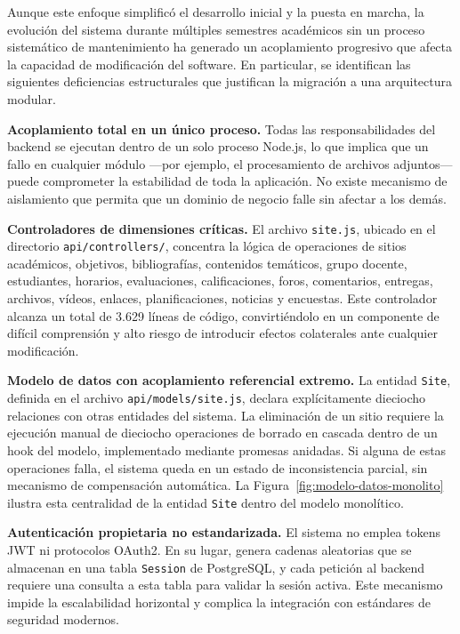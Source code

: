 Aunque este enfoque simplificó el desarrollo inicial y la puesta en marcha, la
evolución del sistema durante múltiples semestres académicos sin un proceso
sistemático de mantenimiento ha generado un acoplamiento progresivo que afecta la
capacidad de modificación del software. En particular, se identifican las siguientes
deficiencias estructurales que justifican la migración a una arquitectura modular.

\textbf{Acoplamiento total en un único proceso.} Todas las responsabilidades del
backend se ejecutan dentro de un solo proceso Node.js, lo que implica que un fallo
en cualquier módulo —por ejemplo, el procesamiento de archivos adjuntos— puede
comprometer la estabilidad de toda la aplicación. No existe mecanismo de aislamiento
que permita que un dominio de negocio falle sin afectar a los demás.

\textbf{Controladores de dimensiones críticas.} El archivo \texttt{site.js}, ubicado
en el directorio \texttt{api/controllers/}, concentra la lógica de operaciones de
sitios académicos, objetivos, bibliografías, contenidos temáticos, grupo docente,
estudiantes, horarios, evaluaciones, calificaciones, foros, comentarios, entregas,
archivos, vídeos, enlaces, planificaciones, noticias y encuestas. Este controlador
alcanza un total de 3.629 líneas de código, convirtiéndolo en un componente de
difícil comprensión y alto riesgo de introducir efectos colaterales ante cualquier
modificación.

\textbf{Modelo de datos con acoplamiento referencial extremo.} La entidad
\texttt{Site}, definida en el archivo \texttt{api/models/site.js}, declara
explícitamente dieciocho relaciones con otras entidades del sistema. La eliminación de
un sitio requiere la ejecución manual de dieciocho operaciones de borrado en cascada
dentro de un hook del modelo, implementado mediante promesas anidadas. Si alguna de
estas operaciones falla, el sistema queda en un estado de inconsistencia parcial, sin
mecanismo de compensación automática. La Figura~\ref{fig:modelo-datos-monolito}
ilustra esta centralidad de la entidad \texttt{Site} dentro del modelo monolítico.

\textbf{Autenticación propietaria no estandarizada.} El sistema no emplea tokens JWT
ni protocolos OAuth2. En su lugar, genera cadenas aleatorias que se almacenan en una
tabla \texttt{Session} de PostgreSQL, y cada petición al backend requiere una consulta
a esta tabla para validar la sesión activa. Este mecanismo impide la escalabilidad
horizontal y complica la integración con estándares de seguridad modernos.

